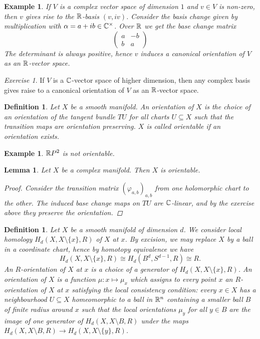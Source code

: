 \documentclass[A4paper, british]{amsart}
\theoremstyle{darkgreentheorem}
\newtheorem{lm}[thm]{Lemma}
\theoremstyle{darkbluedefinition}
\newtheorem{defn}[thm]{Definition}
\theoremstyle{darkredexample}
\newtheorem{exa}[thm]{Example}
\theoremstyle{remark}
\newtheorem{exe}[thm]{Exercise}
\newcommand{\1}{\mathbbm{1}}
\newcommand{\tms}{\times}
\newcommand{\sub}{\subseteq}
\begin{document}
\begin{exa}
    If $V$ is a complex vector space of dimension $1$ and $v\in V$ is non-zero, then $v$ gives rise to the $\mathbb{R}$-basis $(v,iv)$.
    Consider the basis change given by multiplication with $\alpha=a+ib\in \C^{\tms}$.
    Over $\mathbb{R}$ we get the base change matrix
    \[ \begin{pmatrix} a & -b \\ b & a\end{pmatrix} \]
    The determinant is always positive, hence $v$ induces a canonical orientation of $V$ as an $\mathbb{R}$-vector space.
\end{exa}

\begin{exe}
    If $V$ is a $\mathbb{C}$-vector space of higher dimension, then any complex basis gives raise to a canonical orientation of $V$ as an $\mathbb{R}$-vector space.
\end{exe}

\begin{defn}
    Let $X$ be a smooth manifold.
    An \textit{orientation} of $X$ is the choice of an orientation of the tangent bundle $TU$ for all charts $U\sub X$ such that the transition maps are orientation preserving.
    $X$ is called orientable if an orientation exists.
\end{defn}

\begin{exa}
    $\mathbb{R} P^{2}$ is not orientable.
\end{exa}

\begin{lm}
    Let $X$ be a complex manifold.
    Then $X$ is orientable.
    \begin{proof}
	Consider the transition matrix $(\varphi_{a,b})_{a,b}$ from one holomorphic chart to the other.
	The induced base change maps on $TU$ are $\mathbb{C}$-linear, and by the exercise above they preserve the orientation.
    \end{proof}
\end{lm}

\begin{defn}
    Let $X$ be a smooth manifold of dimension $d$.
    We consider \textit{local homology} $H_{d}(X,X\setminus \{x\},R)$ of $X$ at $x$.
    By excision, we may replace $X$ by a ball in a coordinate chart, hence by homotopy equivalence we have
    \[ H_{d}(X,X\setminus\{ x\},R)\cong H_{d}(B^{d},S^{d-1},R)\cong R. \]
    An $R$-orientation of $X$ at $x$ is a choice of a generator of $H_{d}(X,X\setminus \{ x\},R)$.
    An \textit{orientation} of $X$ is a function $\mu\colon x\mapsto \mu_{x}$ which assigns to every point $x$ an $R$-orientation of $X$ at $x$ satisfying the local consistency condition: every $x\in X$ has a neighbourhood $U\sub X$ homeomorphic to a ball in $\mathbb{R}^{n}$ containing a smaller ball $B$ of finite radius around $x$ such that the local orientations $\mu_{y}$ for all $y\in B$ are the image of one generator of $H_{d}(X,X\setminus B,R)$ under the maps $H_{d}(X,X\setminus B,R)\to H_{d}(X,X\setminus \{y\},R)$.
\end{defn}
\end{document}
